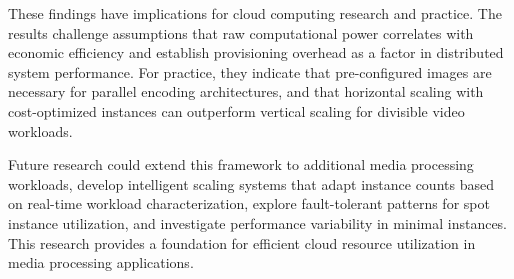 \documentclass[conference]{IEEEtran}
\begin{document}
	These findings have implications for cloud computing research and practice. The results challenge assumptions that raw computational power correlates with economic efficiency and establish provisioning overhead as a factor in distributed system performance. For practice, they indicate that pre-configured images are necessary for parallel encoding architectures, and that horizontal scaling with cost-optimized instances can outperform vertical scaling for divisible video workloads.
	
	Future research could extend this framework to additional media processing workloads, develop intelligent scaling systems that adapt instance counts based on real-time workload characterization, explore fault-tolerant patterns for spot instance utilization, and investigate performance variability in minimal instances. This research provides a foundation for efficient cloud resource utilization in media processing applications.
	\clearpage
\end{document}
